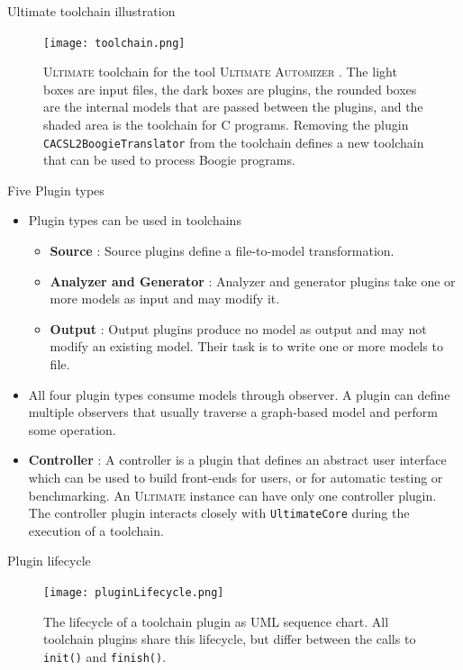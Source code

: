 \documentclass[12pt]{beamer}
\newcommand{\code}[1]{\texttt{#1}}
\newcommand{\ultimate}{\textsc{Ultimate }}
\newcommand{\automizer}{\textsc{Automizer }}
\begin{document}
\captionsetup[figure]{font=scriptsize ,labelfont=scriptsize}
\begin{frame}{Ultimate toolchain illustration}
    \begin{figure}
        \centering
        \texttt{[image: toolchain.png]}
        \caption{\ultimate toolchain for the tool \ultimate \automizer. The light boxes are input files, the dark boxes are plugins, the rounded boxes are the internal models that are passed between the plugins, and the shaded area is the toolchain for C programs. Removing the plugin \code{CACSL2BoogieTranslator} from the toolchain defines a new toolchain that can be used to process Boogie programs.
		}
    \end{figure}    
\end{frame}

\begin{frame}{Five Plugin types}
	\begin{itemize}
		\item Plugin types can be used in toolchains
		\begin{itemize}
			\item \textbf{Source} : Source plugins define a file-to-model transformation.
			\item \textbf{Analyzer and Generator} : Analyzer and generator plugins take one or more models as input and may modify it.
			\item \textbf{Output} : Output plugins produce no model as output and may not modify an existing model. Their task is to write one or more models to file.
		\end{itemize}
		\item All four plugin types consume models through observer. A plugin can define multiple observers that usually traverse a graph-based model and perform some operation.
		\item \textbf{Controller} : A controller is a plugin that defines an abstract user interface which can be used to build front-ends for users, or for automatic testing or benchmarking. An \ultimate instance can have only one controller plugin. The controller plugin interacts closely with \code{UltimateCore} during the execution of a toolchain.
	\end{itemize}
\end{frame}

\captionsetup[figure]{font=scriptsize ,labelfont=scriptsize}
\begin{frame}{Plugin lifecycle}
    \begin{figure}
        \centering
        \texttt{[image: pluginLifecycle.png]}
        \caption{The lifecycle of a toolchain plugin as UML sequence chart. All toolchain plugins share this lifecycle, but differ between the calls to \code{init()} and \code{finish()}.
		}
    \end{figure}    
\end{frame}
\end{document}
